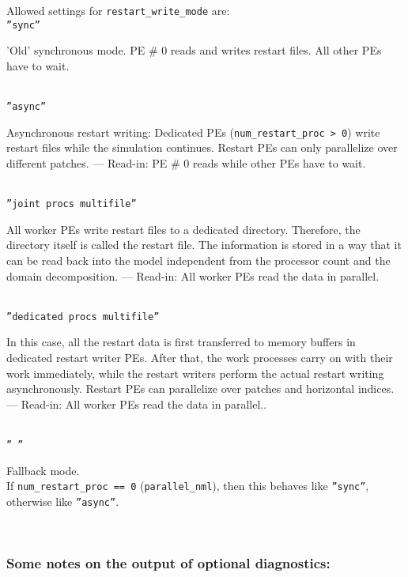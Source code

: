 Allowed settings for \texttt{restart\_write\_mode} are:\\[1em]
\texttt{''sync''} \\
\hspace*{2em} 
\parbox{0.8\textwidth}{\raggedright%
  'Old' synchronous mode. PE \# 0 reads and writes restart files. All other PEs have to wait.}\\[1em]
%
\texttt{''async''} \\
\hspace*{2em} 
\parbox{0.8\textwidth}{\raggedright%
  Asynchronous restart writing:
  Dedicated PEs (\texttt{num\_restart\_proc > 0}) write restart files
  while the simulation continues.  Restart PEs can only parallelize
  over different patches. --- Read-in: PE \# 0 reads while other PEs
  have to wait.  } \\[1em]
%
\texttt{''joint procs multifile''} \\
\hspace*{2em} 
\parbox{0.8\textwidth}{\raggedright%
  All worker PEs write restart files to a dedicated
  directory. Therefore, the directory itself is called the restart
  file.  The information is stored in a way that it can be read back
  into the model independent from the processor count and the domain
  decomposition. --- Read-in: All worker PEs read the data in parallel.
 }\\[1em]
%
\texttt{''dedicated procs multifile''} \\
\hspace*{2em} 
\parbox{0.8\textwidth}{\raggedright%

  In this case, all the restart data is first transferred to memory
  buffers in dedicated restart writer PEs.  After that, the work
  processes carry on with their work immediately, while the restart
  writers perform the actual restart writing asynchronously.  Restart
  PEs can parallelize over patches and horizontal indices.
  --- Read-in: All worker PEs read the data in parallel..
}\\[1em]
%
\texttt{'' ''} \\
\hspace*{2em} 
\parbox{0.8\textwidth}{\raggedright%
  Fallback mode. \\ If \texttt{num\_restart\_proc == 0} (\texttt{parallel\_nml}),
  then this behaves like \texttt{''sync''}, otherwise like \texttt{''async''}.
}\\[1em]

\subsubsection{Some notes on the output of optional diagnostics:}\label{subsec:optdiagnostics}

